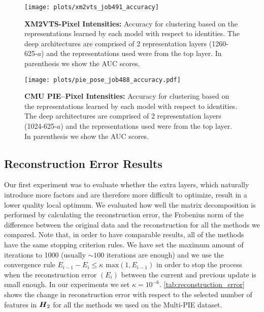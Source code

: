 \documentclass[10pt,journal,compsoc]{IEEEtran}
\begin{document}
\begin{figure}[tb]
     \centering
     \texttt{[image: plots/xm2vts\_job491\_accuracy]}
     \vspace{-2em}
     \caption{\textbf{XM2VTS-Pixel Intensities:} Accuracy for clustering based on the representations learned by each model with respect to identities. The deep architectures are comprised of 2 representation layers (1260-625-$a$) and the representations used were from the top layer. In parenthesis we show the AUC scores.}
     \label{fig:xm2vts_intensities}
\end{figure}
\begin{figure}[ht]
     \centering
     \texttt{[image: plots/pie\_pose\_job488\_accuracy.pdf]}
     \vspace{-2em}
     \caption{\textbf{CMU PIE--Pixel Intensities: } Accuracy for clustering based on the representations learned by each model with respect to identities. The deep architectures are comprised of 2 representation layers (1024-625-$a$) and the representations used were from the top layer. In parenthesis we show the AUC scores.}
     \label{fig:pie_intensities}
\end{figure}

\subsection{Reconstruction Error Results}
Our first experiment was to evaluate whether the extra layers, which naturally introduce more factors and are therefore more difficult to optimize, result in a lower quality local optimum. We evaluated how well the matrix decomposition is performed by calculating the reconstruction error, the Frobenius norm of the difference between the original data and the reconstruction for all the
methods we compared. Note that, in order to have comparable results, all of the methods have the same stopping criterion rules. We have set the maximum amount of iterations to 1000 (usually ${\sim}100$
iterations are enough) and we use the convergence rule $E_{i-1} - E_i \leq \kappa \text{ max}(1, E_{i-1})$ in order to stop the process when the reconstruction error $(E_i)$ between the current and previous update is small enough. In our experiments we set $\kappa = 10^{-6}$. \autoref{tab:reconstruction_error} shows the change in reconstruction error with respect to the selected number of features in $\boldsymbol H_2$ for all the methods we used on the Multi-PIE dataset. 
\end{document}
